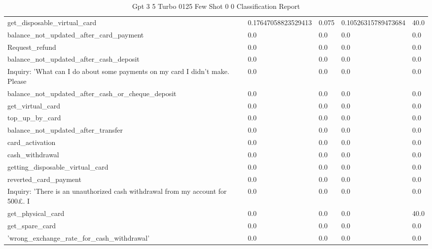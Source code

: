 \begin{table}[!ht]
\begin{tabularx}{\textwidth}{X l l l l}
get\_disposable\_virtual\_card & \num{0.17647058823529413} & \num{0.075} & \num{0.10526315789473684} & \num{40.0} \\
balance\_not\_updated\_after\_card\_payment & \num{0.0} & \num{0.0} & \num{0.0} & \num{0.0} \\
Request\_refund & \num{0.0} & \num{0.0} & \num{0.0} & \num{0.0} \\
balance\_not\_updated\_after\_cash\_deposit & \num{0.0} & \num{0.0} & \num{0.0} & \num{0.0} \\
Inquiry: 'What can I do about some payments on my card I didn't make. Please & \num{0.0} & \num{0.0} & \num{0.0} & \num{0.0} \\
balance\_not\_updated\_after\_cash\_or\_cheque\_deposit & \num{0.0} & \num{0.0} & \num{0.0} & \num{0.0} \\
get\_virtual\_card & \num{0.0} & \num{0.0} & \num{0.0} & \num{0.0} \\
top\_up\_by\_card & \num{0.0} & \num{0.0} & \num{0.0} & \num{0.0} \\
balance\_not\_updated\_after\_transfer & \num{0.0} & \num{0.0} & \num{0.0} & \num{0.0} \\
card\_activation & \num{0.0} & \num{0.0} & \num{0.0} & \num{0.0} \\
cash\_withdrawal & \num{0.0} & \num{0.0} & \num{0.0} & \num{0.0} \\
getting\_disposable\_virtual\_card & \num{0.0} & \num{0.0} & \num{0.0} & \num{0.0} \\
reverted\_card\_payment & \num{0.0} & \num{0.0} & \num{0.0} & \num{0.0} \\
Inquiry: 'There is an unauthorized cash withdrawal from my account for 500£.  I & \num{0.0} & \num{0.0} & \num{0.0} & \num{0.0} \\
get\_physical\_card & \num{0.0} & \num{0.0} & \num{0.0} & \num{40.0} \\
get\_spare\_card & \num{0.0} & \num{0.0} & \num{0.0} & \num{0.0} \\
'wrong\_exchange\_rate\_for\_cash\_withdrawal' & \num{0.0} & \num{0.0} & \num{0.0} & \num{0.0} \\
\bottomrule
\end{tabularx}

        \caption{Gpt 3 5 Turbo 0125 Few Shot 0 0 Classification Report}
        \label{tab:gpt-3-5-turbo-0125-few-shot-0-0-classification-report}
    \end{table}
    